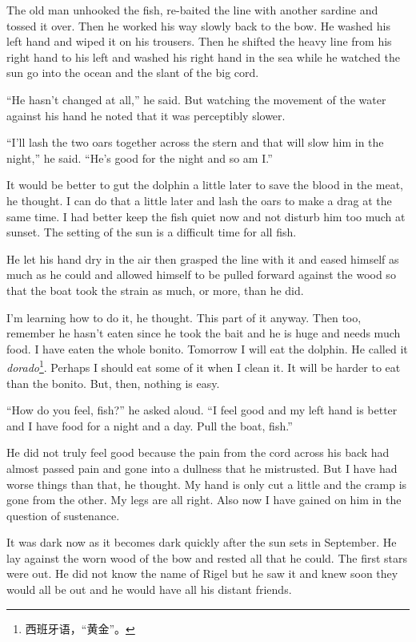 \documentclass[fontset=ubuntu]{ctexrep}
\begin{document}
The old man unhooked the fish, re-baited the line with another sardine and
\gls{tossed} it over. Then he worked his way slowly back to the bow. He washed his
left hand and wiped it on his trousers. Then he shifted the heavy line from
his right hand to his left and washed his right hand in the sea while he
watched the sun go into the ocean and the slant of the big cord.

``He hasn't changed at all,'' he said. But watching the movement of the
water against his hand he noted that it was \gls{perceptibly} slower.

``I'll \gls{lash} the two oars together across the stern and that will slow
him in the night,'' he said. ``He's good for the night and so am I.''

It would be better to gut the dolphin a little later to save the blood in
the meat, he thought. I can do that a little later and lash the oars to make
a drag at the same time. I had better keep the fish quiet now and not
disturb him too much at sunset. The setting of the sun is a difficult time
for all fish.

He let his hand dry in the air then \gls{grasped} the line with it and
\gls{eased} himself as much as he could and allowed himself to be pulled
forward against the wood so that the boat took the strain as much, or more,
than he did.

I'm learning how to do it, he thought. This part of it anyway. Then too,
remember he hasn't eaten since he took the bait and he is huge and needs
much food. I have eaten the whole bonito. Tomorrow I will eat the dolphin.
He called it \emph{dorado}\footnote{西班牙语，“黄金”。}. Perhaps I should eat some
of it when I clean it. It will be harder to eat than the bonito. But, then,
nothing is easy.

``How do you feel, fish?'' he asked aloud. ``I feel good and my left hand is
better and I have food for a night and a day. Pull the boat, fish.''

He did not truly feel good because the pain from the cord across his back
had almost passed pain and gone into a \gls{dullness} that he
\gls{mistrusted}. But I have had worse things than that, he thought. My hand
is only cut a little and the cramp is gone from the other. My legs are all
right. Also now I have gained on him in the question of \gls{sustenance}.

It was dark now as it becomes dark quickly after the sun sets in September.
He lay against the \gls{worn} wood of the bow and rested all that he could. The
first stars were out. He did not know the name of \gls{Rigel} but he saw it and
knew soon they would all be out and he would have all his \gls{distant} friends.
\end{document}

